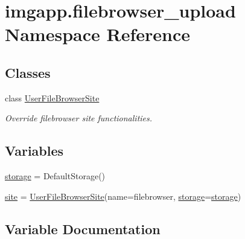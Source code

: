 \hypertarget{namespaceimgapp_1_1filebrowser__upload}{}\section{imgapp.\+filebrowser\+\_\+upload Namespace Reference}
\label{namespaceimgapp_1_1filebrowser__upload}
\subsection*{Classes}
\begin{DoxyCompactItemize}
\item 
class \hyperlink{classimgapp_1_1filebrowser__upload_1_1UserFileBrowserSite}{User\+File\+Browser\+Site}
\begin{DoxyCompactList}\small\item\em Override filebrowser site functionalities. \end{DoxyCompactList}\end{DoxyCompactItemize}
\subsection*{Variables}
\begin{DoxyCompactItemize}
\item 
\hyperlink{namespaceimgapp_1_1filebrowser__upload_ae26049c70fbfba51dec84d62840e6a01}{storage} = Default\+Storage()
\item 
\hyperlink{namespaceimgapp_1_1filebrowser__upload_a4f8619d5576e067e06247f18cd273af8}{site} = \hyperlink{classimgapp_1_1filebrowser__upload_1_1UserFileBrowserSite}{User\+File\+Browser\+Site}(name=\textquotesingle{}filebrowser\textquotesingle{}, \hyperlink{namespaceimgapp_1_1filebrowser__upload_ae26049c70fbfba51dec84d62840e6a01}{storage}=\hyperlink{namespaceimgapp_1_1filebrowser__upload_ae26049c70fbfba51dec84d62840e6a01}{storage})
\end{DoxyCompactItemize}


\subsection{Variable Documentation}
\mbox{\label{namespaceimgapp_1_1filebrowser__upload_a4f8619d5576e067e06247f18cd273af8}} 
